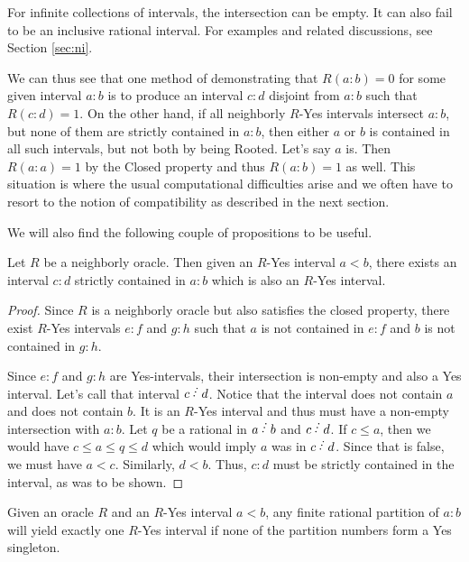 \documentclass[12pt]{article}
\begin{document}
For infinite collections of intervals, the intersection can be empty. It can also fail to be an inclusive rational interval. For examples and related discussions, see Section \ref{sec:ni}. 

We can thus see that one method of demonstrating that $R(a:b)=0$ for some given interval $a:b$ is to produce an interval $c:d$ disjoint from $a:b$ such that $R(c:d)=1$. On the other hand, if all neighborly $R$-Yes intervals intersect $a:b$, but none of them are strictly contained in $a:b$, then either $a$ or $b$ is contained in all such intervals, but not both by being Rooted. Let's say $a$ is. Then $R(a:a)=1$ by the Closed property and thus $R(a:b)=1$ as well. This situation is where the usual computational difficulties arise and we often have to resort to the notion of compatibility as described in the next section. 

We will also find the following couple of propositions to be useful. 

\begin{proposition}\label{pr:subinter}
Let $R$ be a neighborly oracle. Then given an $R$-Yes interval $a\lt b$, there exists an interval $c:d$ strictly contained in $a:b$ which is also an $R$-Yes interval. 
\end{proposition}

\begin{proof}
Since $R$ is a neighborly oracle but also satisfies the closed property, there exist $R$-Yes intervals $e:f$ and $g:h$ such that $a$ is not contained in $e:f$ and $b$ is not contained in $g:h$. 

Since $e:f$ and $g:h$ are Yes-intervals, their intersection is non-empty and also a Yes interval. Let's call that interval $c\lte d$.  Notice that the interval does not contain $a$ and does not contain $b$. It is an $R$-Yes interval and thus must have a non-empty intersection with $a:b$. Let $q$ be a rational in $a\lte b$ and $c \lte d$. If $c\leq a$, then we would have $c \leq a \leq q \leq d$ which would imply $a$ was in $c \lte d$. Since that is false, we must have $a < c$. Similarly, $d < b$. Thus, $c:d$ must be strictly contained in the interval, as was to be shown. 
\end{proof}

\begin{proposition}\label{pr:multi}
Given an oracle $R$ and an $R$-Yes interval $a\lt b$, any finite rational partition of $a:b$ will yield exactly one $R$-Yes interval if none of the partition numbers form a Yes singleton. 
\end{proposition}
\end{document}
